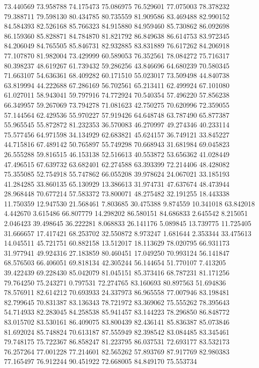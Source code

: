73.440569
73.958788
74.175473
75.086975
76.529601
77.075003
78.378232
79.388711
79.598130
80.434785
80.735559
81.909586
83.469488
82.990152
84.584393
82.526168
85.766323
84.915880
84.959460
85.730862
86.092698
86.159360
85.828871
84.784870
81.821792
86.849638
86.614753
83.972345
84.206049
84.765505
85.846731
82.932885
83.831889
76.617262
84.206918
77.107870
81.982004
73.429999
60.589053
76.352561
78.084272
75.716317
80.398237
48.619267
61.739432
59.286256
43.846696
64.680239
70.580345
71.663107
54.636361
68.409282
60.171510
55.023017
73.509498
44.840738
63.819994
44.222688
67.286169
56.702561
65.213411
62.499924
67.101080
61.027011
58.943041
59.797916
74.772924
70.540354
57.496220
57.856238
66.349957
59.267069
73.794278
71.081623
42.750275
70.620996
72.359055
57.144564
62.429536
55.970227
57.919426
64.648748
63.787490
65.877387
55.965545
55.872872
81.232353
36.570083
46.270997
49.274346
40.233114
75.577456
64.971598
34.134929
62.683821
45.624157
36.749121
33.845227
44.715816
67.489142
50.765897
55.749298
70.668943
31.681984
69.045823
26.555288
59.816515
46.153138
52.516613
40.553872
53.656362
41.028449
47.496515
67.639732
63.682401
62.274588
63.393399
72.214406
48.428082
75.355085
52.754918
55.747862
66.055208
39.978624
24.067021
33.185193
41.284285
33.860135
65.130929
13.386613
31.974731
47.637674
48.473944
28.968448
70.677214
57.583372
73.800071
48.275482
32.191255
18.443338
11.750359
12.947530
21.568461
7.803685
30.475388
9.874559
10.341018
63.842018
4.442670
3.615486
66.807779
14.298202
86.580151
84.686833
2.645542
8.215051
2.046423
39.498645
36.222281
8.068833
26.141176
5.089845
13.739775
11.725405
31.666657
17.417421
68.253702
32.550872
8.973247
1.681644
2.353344
33.475613
14.045511
45.721751
60.882158
13.512017
18.113629
78.020795
66.931173
31.977941
49.924316
27.183859
80.460451
17.049250
70.993124
56.141847
68.576503
66.406051
69.818134
42.305244
56.144654
51.770107
7.413205
39.422439
69.228430
85.042079
81.045151
85.373416
68.787231
81.171256
79.764250
75.243271
0.797531
72.274765
83.160693
80.897563
51.694836
78.576911
82.614212
70.693933
24.337973
86.965558
77.007946
83.198481
82.799645
70.831387
83.136343
78.721972
83.369062
75.555262
78.395643
54.714933
82.283045
84.258538
85.941457
83.144223
78.296850
86.848772
83.015702
83.530161
86.409075
83.800439
82.436141
85.836387
85.073846
81.692024
85.748824
70.613187
87.555949
82.398542
83.084485
83.345461
79.748175
75.722367
86.858247
81.223795
86.037531
72.693177
83.532173
76.257264
77.001228
77.214601
82.565262
57.893769
87.917769
82.980383
77.165497
76.912244
90.451922
72.668005
84.849170
75.553734
